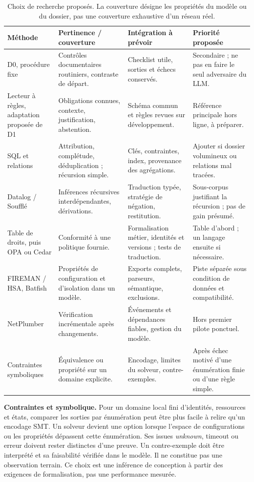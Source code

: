 \documentclass[11pt,a4paper]{article}
\begin{document}
\begin{table}[htbp]
\centering\small
\begin{tabularx}{\linewidth}{@{}P{27mm}YYY@{}}
\toprule
Méthode & Pertinence / couverture & Intégration à prévoir & Priorité proposée\\
\midrule
D0, procédure fixe & Contrôles documentaires routiniers, contraste de départ. &
Checklist utile, sorties et échecs conservés. & Secondaire ; ne pas en faire
le seul adversaire du LLM.\\
Lecteur à règles, adaptation proposée de D1 & Obligations connues, contexte,
justification, abstention. & Schéma commun et règles revues sur développement. &
Référence principale hors ligne, à préparer.\\
SQL et relations & Attribution, complétude, déduplication ; récursion simple. &
Clés, contraintes, index, provenance des agrégations. & Ajouter si dossier
volumineux ou relations mal tracées.\\
Datalog / Soufflé & Inférences récursives interdépendantes, dérivations. &
Traduction typée, stratégie de négation, restitution. & Sous-corpus justifiant
la récursion ; pas de gain présumé.\\
Table de droits, puis OPA ou Cedar & Conformité à une politique fournie. &
Formalisation métier, identités et versions ; tests de traduction. & Table
d'abord ; un langage ensuite si nécessaire.\\
FIREMAN / HSA, Batfish & Propriétés de configuration et d'isolation dans un modèle. &
Exports complets, parseurs, sémantique, exclusions. & Piste séparée sous condition
de données et compatibilité.\\
NetPlumber & Vérification incrémentale après changements. & Événements et
dépendances fiables, gestion du modèle. & Hors premier pilote ponctuel.\\
Contraintes symboliques & Équivalence ou propriété sur un domaine explicite. &
Encodage, limites du solveur, contre-exemples. & Après échec motivé d'une
énumération finie ou d'une règle simple.\\
\bottomrule
\end{tabularx}
\caption{Choix de recherche proposés. La couverture désigne les propriétés
du modèle ou du dossier, pas une couverture exhaustive d'un réseau réel.}
\label{tab:choices}
\end{table}

\textbf{Contraintes et symbolique.} Pour un domaine local fini d'identités,
ressources et états, comparer les sorties par énumération peut être plus facile
à relire qu'un encodage SMT. Un solveur devient une option lorsque l'espace
de configurations ou les propriétés dépassent cette énumération. Ses issues
\emph{unknown}, timeout ou erreur doivent rester distinctes d'une preuve.
Un contre-exemple doit être interprété et sa faisabilité vérifiée dans le modèle.
Il ne constitue pas une observation terrain. Ce choix est une inférence de
conception à partir des exigences de formalisation, pas une performance mesurée.
\end{document}
